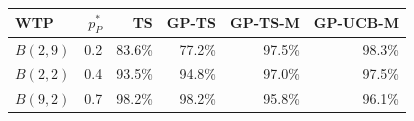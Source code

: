 \begin{tabular}{lrrrrr}
\toprule
WTP & $p^*_P$ & TS & GP-TS & GP-TS-M & GP-UCB-M \\
\midrule
$B(2,9)$ & 0.2 & 83.6\% & 77.2\% & 97.5\% & 98.3\% \\
$B(2,2)$ & 0.4 & 93.5\% & 94.8\% & 97.0\% & 97.5\% \\
$B(9,2)$ & 0.7 & 98.2\% & 98.2\% & 95.8\% & 96.1\% \\
\bottomrule
\end{tabular}

